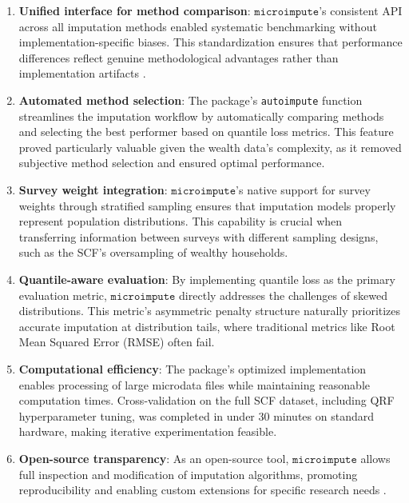 \begin{enumerate}
    \item \textbf{Unified interface for method comparison}: $\texttt{microimpute}$'s consistent API across all imputation methods enabled systematic benchmarking without implementation-specific biases. This standardization ensures that performance differences reflect genuine methodological advantages rather than implementation artifacts \citep{policyengine2025microimpute}.

    \item \textbf{Automated method selection}: The package's \texttt{autoimpute} function streamlines the imputation workflow by automatically comparing methods and selecting the best performer based on quantile loss metrics. This feature proved particularly valuable given the wealth data's complexity, as it removed subjective method selection and ensured optimal performance.

    \item \textbf{Survey weight integration}: $\texttt{microimpute}$'s native support for survey weights through stratified sampling ensures that imputation models properly represent population distributions. This capability is crucial when transferring information between surveys with different sampling designs, such as the SCF's oversampling of wealthy households.

    \item \textbf{Quantile-aware evaluation}: By implementing quantile loss as the primary evaluation metric, $\texttt{microimpute}$ directly addresses the challenges of skewed distributions. This metric's asymmetric penalty structure naturally prioritizes accurate imputation at distribution tails, where traditional metrics like Root Mean Squared Error (RMSE) often fail.

    \item \textbf{Computational efficiency}: The package's optimized implementation enables processing of large microdata files while maintaining reasonable computation times. Cross-validation on the full SCF dataset, including QRF hyperparameter tuning, was completed in under 30 minutes on standard hardware, making iterative experimentation feasible.

    \item \textbf{Open-source transparency}: As an open-source tool, $\texttt{microimpute}$ allows full inspection and modification of imputation algorithms, promoting reproducibility and enabling custom extensions for specific research needs \citep{policyengine2025microimpute}.
\end{enumerate}

